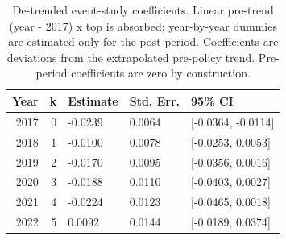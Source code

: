 \begin{table}[ht]
\centering
\caption{De-trended event-study coefficients. Linear pre-trend (year - 2017) x top is absorbed; year-by-year dummies are estimated only for the post period. Coefficients are deviations from the extrapolated pre-policy trend. Pre-period coefficients are zero by construction.} 
\label{tab:phase4_within_intensive_did_eventstudy_detrended}
\begin{tabular}{rrlll}
  \toprule
Year & k & Estimate & Std. Err. & 95\% CI \\ 
  \midrule
2017 &   0 & -0.0239 & 0.0064 & [-0.0364, -0.0114] \\ 
  2018 &   1 & -0.0100 & 0.0078 & [-0.0253, 0.0053] \\ 
  2019 &   2 & -0.0170 & 0.0095 & [-0.0356, 0.0016] \\ 
  2020 &   3 & -0.0188 & 0.0110 & [-0.0403, 0.0027] \\ 
  2021 &   4 & -0.0224 & 0.0123 & [-0.0465, 0.0018] \\ 
  2022 &   5 & 0.0092 & 0.0144 & [-0.0189, 0.0374] \\ 
   \bottomrule
\end{tabular}
\end{table}
